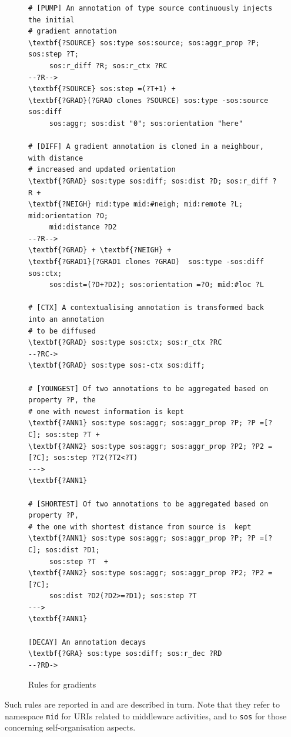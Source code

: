 \documentclass[12pt,a4paper,twoside,openright]{book}
\begin{document}
\begin{figure}\vspace{10pt}
{\footnotesize \begin{Verbatim}[samepage=true, frame=single, commandchars=\\\{\}, label={\small \bf Transition Rules for Gradients}]
# [PUMP] An annotation of type source continuously injects the initial
# gradient annotation
\textbf{?SOURCE} sos:type sos:source; sos:aggr_prop ?P; sos:step ?T;
     sos:r_diff ?R; sos:r_ctx ?RC
--?R--> 
\textbf{?SOURCE} sos:step =(?T+1) +
\textbf{?GRAD}(?GRAD clones ?SOURCE) sos:type -sos:source sos:diff
     sos:aggr; sos:dist "0"; sos:orientation "here"

# [DIFF] A gradient annotation is cloned in a neighbour, with distance
# increased and updated orientation
\textbf{?GRAD} sos:type sos:diff; sos:dist ?D; sos:r_diff ?R +
\textbf{?NEIGH} mid:type mid:#neigh; mid:remote ?L; mid:orientation ?O;
     mid:distance ?D2
--?R-->
\textbf{?GRAD} + \textbf{?NEIGH} +
\textbf{?GRAD1}(?GRAD1 clones ?GRAD)  sos:type -sos:diff sos:ctx;
     sos:dist=(?D+?D2); sos:orientation =?O; mid:#loc ?L

# [CTX] A contextualising annotation is transformed back into an annotation
# to be diffused
\textbf{?GRAD} sos:type sos:ctx; sos:r_ctx ?RC
--?RC->
\textbf{?GRAD} sos:type sos:-ctx sos:diff;

# [YOUNGEST] Of two annotations to be aggregated based on property ?P, the
# one with newest information is kept
\textbf{?ANN1} sos:type sos:aggr; sos:aggr_prop ?P; ?P =[?C]; sos:step ?T +
\textbf{?ANN2} sos:type sos:aggr; sos:aggr_prop ?P2; ?P2 =[?C]; sos:step ?T2(?T2<?T)
--->
\textbf{?ANN1}

# [SHORTEST] Of two annotations to be aggregated based on property ?P,
# the one with shortest distance from source is  kept
\textbf{?ANN1} sos:type sos:aggr; sos:aggr_prop ?P; ?P =[?C]; sos:dist ?D1;
     sos:step ?T  +
\textbf{?ANN2} sos:type sos:aggr; sos:aggr_prop ?P2; ?P2 =[?C];
     sos:dist ?D2(?D2>=?D1); sos:step ?T
--->
\textbf{?ANN1}

[DECAY] An annotation decays
\textbf{?GRA} sos:type sos:diff; sos:r_dec ?RD
--?RD->

\end{Verbatim}
}
\vspace{-10pt}\caption{Rules for gradients}\label{laws:gradient}
\end{figure}

Such rules are reported in  and are described in turn.
%
Note that they refer to namespace \texttt{mid} for URIs related to middleware activities, and to \texttt{sos} for those concerning self-organisation aspects.
\end{document}
